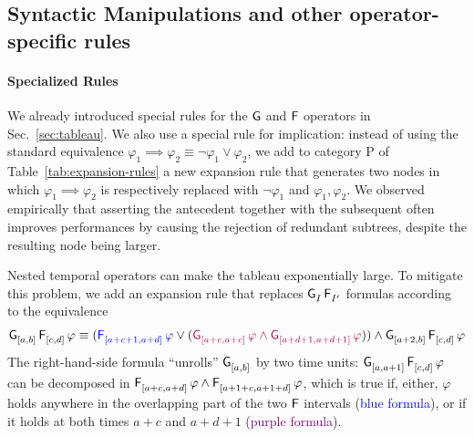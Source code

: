 \documentclass[acmsmall,screen]{acmart}
\begin{document}

\subsection{Syntactic Manipulations and other operator-specific rules}
\label{sec:syntactic-manip}

\paragraph{Specialized Rules}
We already introduced special rules for the $\mathsf{G}$ and $\mathsf{F}$ operators in Sec.~\ref{sec:tableau}.
We also use a special rule for implication: instead of using the standard equivalence $\varphi_1 \implies \varphi_2 \equiv \neg \varphi_1 \lor \varphi_2$,
we add to category P of Table~\ref{tab:expansion-rules} a new expansion rule that generates two nodes in which $\varphi_1 \implies \varphi_2$ is respectively replaced with $\neg \varphi_1$ and $\varphi_1, \varphi_2$.
We observed empirically that asserting the antecedent together with the subsequent often improves performances
by causing the rejection of redundant subtrees, despite the resulting node being larger.

Nested temporal operators can make the tableau exponentially large.
To mitigate this problem, we add an expansion rule that replaces $\mathop{\mathsf{\mathsf{G}}^{{}}_{I}} \mathop{\mathsf{\mathsf{F}}^{{}}_{I'}}$ formulas according to the equivalence
\[
\mathop{\mathsf{\mathsf{G}}^{{}}_{[a,b]}} \mathop{\mathsf{\mathsf{F}}^{{}}_{[c,d]}} \varphi \equiv
(\textcolor{blue}{\mathop{\mathsf{\mathsf{F}}^{{}}_{[a+c+1,a+d]}} \varphi} \lor (\textcolor{purple}{\mathop{\mathsf{\mathsf{G}}^{{}}_{[a+c,a+c]}} \varphi \land \mathop{\mathsf{\mathsf{G}}^{{}}_{[a+d+1,a+d+1]}} \varphi})) \land \mathop{\mathsf{\mathsf{G}}^{{}}_{[a+2,b]}} \mathop{\mathsf{\mathsf{F}}^{{}}_{[c,d]}} \varphi
\]
The right-hand-side formula ``unrolls'' $\mathop{\mathsf{\mathsf{G}}^{{}}_{[a,b]}}$ by two time units:
$\mathop{\mathsf{\mathsf{G}}^{{}}_{[a,a+1]}} \mathop{\mathsf{\mathsf{F}}^{{}}_{[c,d]}} \varphi$ can be decomposed in
$\mathop{\mathsf{\mathsf{F}}^{{}}_{[a+c,a+d]}} \varphi \land \mathop{\mathsf{\mathsf{F}}^{{}}_{[a+1+c,a+1+d]}} \varphi$,
which is true if, either, $\varphi$ holds anywhere in the overlapping part of the two $\mathsf{F}$ intervals
(\textcolor{blue}{blue formula}),
or if it holds at both times $a+c$ and $a+d+1$ (\textcolor{purple}{purple formula}).
\end{document}
